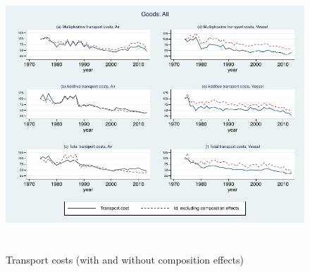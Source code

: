 \documentclass[a4paper,11pt]{article}
\begin{document}
\begin{figure}[htbp]
\caption{Transport costs (with and without composition effects)}
\label{fig:totalTC_compeffects_excl}
\begin{center}
\includegraphics[height=4in]
{graph_composition_all.pdf}
\end{center}
\end{figure}
\end{document}
